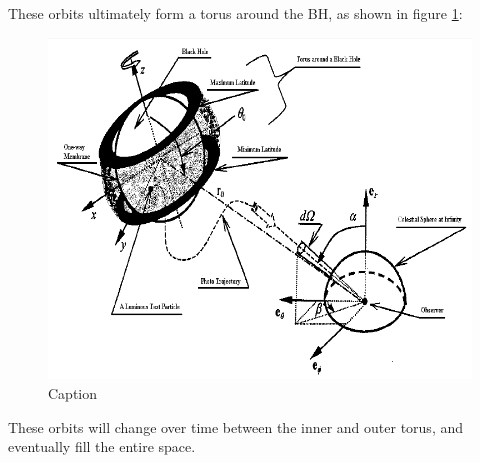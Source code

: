 \documentclass[11pt,table]{article}
\begin{document}
These orbits ultimately form a torus around the BH, as shown in figure \ref{fig:kerr_torus}:

\begin{figure}
    \centering
    \includegraphics[width=0.95\linewidth]{Figures/kerr-torrus.png}
    \caption{Caption}
    \label{fig:kerr_torus}
\end{figure}

These orbits will change over time between the inner and outer torus, and eventually fill the entire space. 
\end{document}
